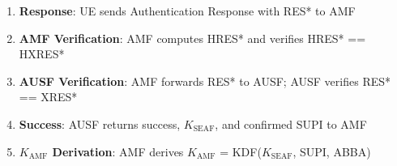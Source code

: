 \begin{enumerate}
  \begin{itemize}
  \tightlist
  \item
    RES, CK, IK from RAND using f2, f3, f4
  \item
    RES* = KDF(CK, IK, SN-name, RAND, RES)
  \item
    \ensuremath{K_{\mathrm{AUSF}}} = KDF(CK, IK, SN-name, SQN\ensuremath{\oplus}AK)
  \item
    \ensuremath{K_{\mathrm{SEAF}}} = KDF(\ensuremath{K_{\mathrm{AUSF}}}, SN-name)
  \item
    \ensuremath{K_{\mathrm{AMF}}} = KDF(\ensuremath{K_{\mathrm{SEAF}}}, SUPI, ABBA)
  \end{itemize}
\item
  \textbf{Response}: UE sends Authentication Response with RES* to AMF
\item
  \textbf{AMF Verification}: AMF computes HRES* and verifies HRES* == HXRES*
\item
  \textbf{AUSF Verification}: AMF forwards RES* to AUSF; AUSF verifies RES* == XRES*
\item
  \textbf{Success}: AUSF returns success, \ensuremath{K_{\mathrm{SEAF}}}, and confirmed SUPI to AMF
\item
  \textbf{\ensuremath{K_{\mathrm{AMF}}} Derivation}: AMF derives \ensuremath{K_{\mathrm{AMF}}} = KDF(\ensuremath{K_{\mathrm{SEAF}}}, SUPI, ABBA)
\end{enumerate}










